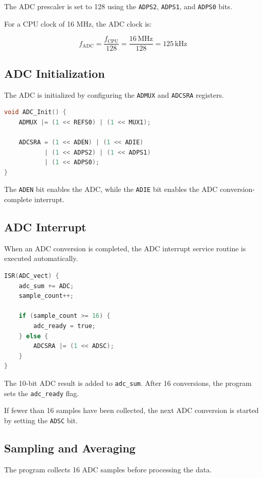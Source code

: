\documentclass[12pt,a4paper]{article}
\begin{document}
The ADC prescaler is set to 128 using the \texttt{ADPS2}, \texttt{ADPS1}, and \texttt{ADPS0} bits.

For a CPU clock of 16 MHz, the ADC clock is:

\[
f_{\mathrm{ADC}}
=
\frac{f_{\mathrm{CPU}}}{128}
=
\frac{16\,\mathrm{MHz}}{128}
=
125\,\mathrm{kHz}
\]

\subsection{ADC Initialization}

The ADC is initialized by configuring the \texttt{ADMUX} and \texttt{ADCSRA} registers.

\begin{lstlisting}[language=C]
void ADC_Init() {
    ADMUX |= (1 << REFS0) | (1 << MUX1);

    ADCSRA = (1 << ADEN) | (1 << ADIE)
           | (1 << ADPS2) | (1 << ADPS1)
           | (1 << ADPS0);
}
\end{lstlisting}

The \texttt{ADEN} bit enables the ADC, while the \texttt{ADIE} bit enables the ADC conversion-complete interrupt.

\subsection{ADC Interrupt}

When an ADC conversion is completed, the ADC interrupt service routine is executed automatically.

\begin{lstlisting}[language=C]
ISR(ADC_vect) {
    adc_sum += ADC;
    sample_count++;

    if (sample_count >= 16) {
        adc_ready = true;
    } else {
        ADCSRA |= (1 << ADSC);
    }
}
\end{lstlisting}

The 10-bit ADC result is added to \texttt{adc\_sum}. After 16 conversions, the program sets the \texttt{adc\_ready} flag.

If fewer than 16 samples have been collected, the next ADC conversion is started by setting the \texttt{ADSC} bit.

\subsection{Sampling and Averaging}

The program collects 16 ADC samples before processing the data.
\end{document}
